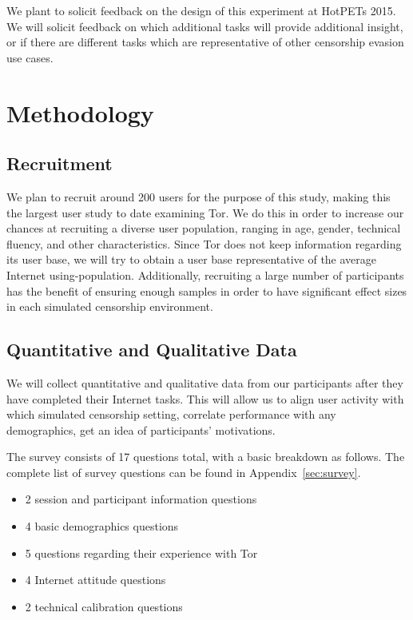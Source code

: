 \documentclass[letterpaper,twocolumn,11pt]{article}
\begin{document}
We plant to solicit feedback on the design of this experiment at HotPETs 2015. 
We will solicit feedback on which additional tasks will provide additional insight,
or if there are different tasks which are representative of other censorship evasion use cases.

\section{Methodology}  

\subsection{Recruitment}  
\indent \indent We plan to recruit around 200 users for the purpose of this study, making this the largest user 
study to date examining Tor. We do this in order to increase our chances at recruiting a diverse
user population, ranging in age, gender, technical fluency, and other characteristics. Since Tor 
does not keep information regarding its user base, we will try to obtain a user base representative of
the average Internet using-population. Additionally, recruiting a large number of participants has the 
benefit of ensuring enough samples in order to have significant effect sizes in 
each simulated censorship environment. 

\subsection{Quantitative and Qualitative Data}   
\indent \indent We will collect quantitative and qualitative data from our participants after they have completed 
their Internet tasks. This will allow us to align user activity with which simulated censorship setting, 
correlate performance with any demographics, get an idea of participants' motivations. 

The survey consists of 17 questions total, with a basic breakdown as follows. 
The complete list of survey questions can be found in Appendix~\ref{sec:survey}.

\begin{itemize} \itemsep1pt \parskip0pt 
\item 2 session and participant information questions
\item 4 basic demographics questions
\item 5 questions regarding their experience with Tor
\item 4 Internet attitude questions
\item 2 technical calibration questions
\end{itemize}
\end{document}
